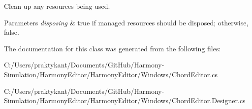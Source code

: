 Clean up any resources being used. 


\begin{DoxyParams}{Parameters}
{\em disposing} & true if managed resources should be disposed; otherwise, false.\\
\hline
\end{DoxyParams}


The documentation for this class was generated from the following files\+:\begin{DoxyCompactItemize}
\item 
C\+:/\+Users/praktykant/\+Documents/\+Git\+Hub/\+Harmony-\/\+Simulation/\+Harmony\+Editor/\+Harmony\+Editor/\+Windows/Chord\+Editor.\+cs\item 
C\+:/\+Users/praktykant/\+Documents/\+Git\+Hub/\+Harmony-\/\+Simulation/\+Harmony\+Editor/\+Harmony\+Editor/\+Windows/Chord\+Editor.\+Designer.\+cs\end{DoxyCompactItemize}

